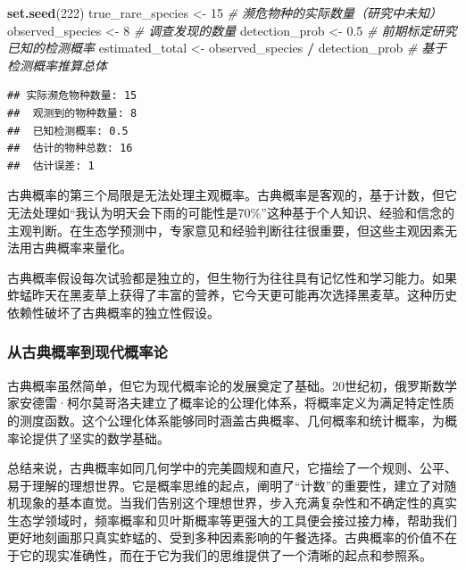 \documentclass[
  twoside,12pt,fontset=none]{ctexbook}
\newenvironment{Shaded}{\begin{snugshade}}{\end{snugshade}}
\newcommand{\CommentTok}[1]{\textcolor[rgb]{0.56,0.35,0.01}{\textit{#1}}}
\newcommand{\DecValTok}[1]{\textcolor[rgb]{0.00,0.00,0.81}{#1}}
\newcommand{\FloatTok}[1]{\textcolor[rgb]{0.00,0.00,0.81}{#1}}
\newcommand{\FunctionTok}[1]{\textcolor[rgb]{0.13,0.29,0.53}{\textbf{#1}}}
\newcommand{\NormalTok}[1]{#1}
\newcommand{\OtherTok}[1]{\textcolor[rgb]{0.56,0.35,0.01}{#1}}
\newcommand{\SpecialCharTok}[1]{\textcolor[rgb]{0.81,0.36,0.00}{\textbf{#1}}}
\begin{document}
\begin{Shaded}
\begin{Highlighting}[]
\FunctionTok{set.seed}\NormalTok{(}\DecValTok{222}\NormalTok{)}
\NormalTok{true\_rare\_species }\OtherTok{\textless{}{-}} \DecValTok{15}     \CommentTok{\# 濒危物种的实际数量（研究中未知）}
\NormalTok{observed\_species }\OtherTok{\textless{}{-}} \DecValTok{8}       \CommentTok{\# 调查发现的数量}
\NormalTok{detection\_prob }\OtherTok{\textless{}{-}} \FloatTok{0.5}       \CommentTok{\# 前期标定研究已知的检测概率}
\NormalTok{estimated\_total }\OtherTok{\textless{}{-}}\NormalTok{ observed\_species }\SpecialCharTok{/}\NormalTok{ detection\_prob  }\CommentTok{\# 基于检测概率推算总体}
\end{Highlighting}
\end{Shaded}

\begin{verbatim}
## 实际濒危物种数量: 15 
##  观测到的物种数量: 8 
##  已知检测概率: 0.5 
##  估计的物种总数: 16 
##  估计误差: 1
\end{verbatim}

古典概率的第三个局限是无法处理主观概率。古典概率是客观的，基于计数，但它无法处理如``我认为明天会下雨的可能性是70\%''这种基于个人知识、经验和信念的主观判断。在生态学预测中，专家意见和经验判断往往很重要，但这些主观因素无法用古典概率来量化。

古典概率假设每次试验都是独立的，但生物行为往往具有记忆性和学习能力。如果蚱蜢昨天在黑麦草上获得了丰富的营养，它今天更可能再次选择黑麦草。这种历史依赖性破坏了古典概率的独立性假设。

\hypertarget{ux4eceux53e4ux5178ux6982ux7387ux5230ux73b0ux4ee3ux6982ux7387ux8bba}{%
\subsubsection{从古典概率到现代概率论}\label{ux4eceux53e4ux5178ux6982ux7387ux5230ux73b0ux4ee3ux6982ux7387ux8bba}}

古典概率虽然简单，但它为现代概率论的发展奠定了基础。20世纪初，俄罗斯数学家安德雷·柯尔莫哥洛夫建立了概率论的公理化体系，将概率定义为满足特定性质的测度函数。这个公理化体系能够同时涵盖古典概率、几何概率和统计概率，为概率论提供了坚实的数学基础。

总结来说，古典概率如同几何学中的完美圆规和直尺，它描绘了一个规则、公平、易于理解的理想世界。它是概率思维的起点，阐明了``计数''的重要性，建立了对随机现象的基本直觉。当我们告别这个理想世界，步入充满复杂性和不确定性的真实生态学领域时，频率概率和贝叶斯概率等更强大的工具便会接过接力棒，帮助我们更好地刻画那只真实蚱蜢的、受到多种因素影响的午餐选择。古典概率的价值不在于它的现实准确性，而在于它为我们的思维提供了一个清晰的起点和参照系。
\end{document}
